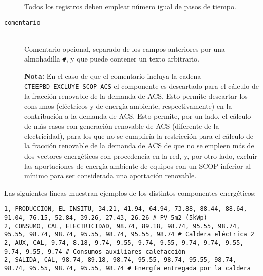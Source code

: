 \documentclass[10pt,notitlepage,oneside,a4paper]{article}
\begin{document}
\begin{description}
          Todos los registros deben emplear número igual de pasos de tiempo.

    \item [\texttt{comentario}] \hfill \\
          Comentario opcional, separado de los campos anteriores por una almohadilla \texttt{\#}, y que puede contener un texto arbitrario.
          \begin{myquote}\small
              \textbf{Nota:} En el caso de que el comentario incluya la cadena \texttt{CTEEPBD\_EXCLUYE\_SCOP\_ACS} el componente es descartado para el cálculo de la fracción renovable de la demanda de ACS. Esto permite descartar los consumos (eléctricos y de energía ambiente, respectivamente) en la contribución a la demanda de ACS. Esto permite, por un lado, el cálculo de más casos con generación renovable de ACS (diferente de la electricidad), para los que no se cumpliría la restricción para el cálculo de la fracción renovable de la demanda de ACS de que no se empleen más de dos vectores energéticos con procedencia en la red, y, por otro lado, excluir las aportaciones de energía ambiente de equipos con un SCOP inferior al mínimo para ser considerada una aportación renovable.
          \end{myquote}
\end{description}

Las siguientes líneas muestran ejemplos de los distintos componentes energéticos:

\begin{lstlisting}
1, PRODUCCION, EL_INSITU, 34.21, 41.94, 64.94, 73.88, 88.44, 88.64, 91.04, 76.15, 52.84, 39.26, 27.43, 26.26 # PV 5m2 (5kWp)
2, CONSUMO, CAL, ELECTRICIDAD, 98.74, 89.18, 98.74, 95.55, 98.74, 95.55, 98.74, 98.74, 95.55, 98.74, 95.55, 98.74 # Caldera eléctrica 2
2, AUX, CAL, 9.74, 8.18, 9.74, 9.55, 9.74, 9.55, 9.74, 9.74, 9.55, 9.74, 9.55, 9.74 # Consumos auxiliares calefacción
2, SALIDA, CAL, 98.74, 89.18, 98.74, 95.55, 98.74, 95.55, 98.74, 98.74, 95.55, 98.74, 95.55, 98.74 # Energía entregada por la caldera
\end{lstlisting}
\end{document}
